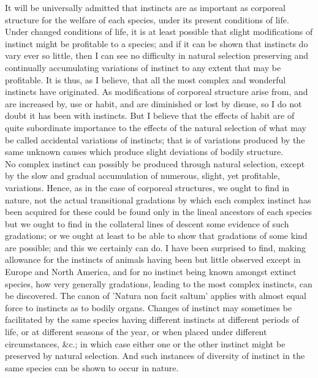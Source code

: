 \indent It will be universally admitted that instincts are as important as corporeal structure for the welfare of each species, under its present conditions of life. Under changed conditions of life, it is at least possible that slight modifications of instinct might be profitable to a species; and if it can be shown that instincts do vary ever so little, then I can see no difficulty in natural selection preserving and continually accumulating variations of instinct to any extent that may be profitable. It is thus, as I believe, that all the most complex and wonderful instincts have originated. As modifications of corporeal structure arise from, and are increased by, use or habit, and are diminished or lost by disuse, so I do not doubt it has been with instincts. But I believe that the effects of habit are of quite subordinate importance to the effects of the natural selection of what may be called accidental variations of instincts; that is of variations produced by the same unknown causes which produce slight deviations of bodily structure.\\
\indent No complex instinct can possibly be produced through natural selection, except by the slow and gradual accumulation of numerous, slight, yet profitable, variations. Hence, as in the case of corporeal structures, we ought to find in nature, not the actual transitional gradations by which each complex instinct has been acquired for these could be found only in the lineal ancestors of each species but we ought to find in the collateral lines of descent some evidence of such gradations; or we ought at least to be able to show that gradations of some kind are possible; and this we certainly can do. I have been surprised to find, making allowance for the instincts of animals having been but little observed except in Europe and North America, and for no instinct being known amongst extinct species, how very generally gradations, leading to the most complex instincts, can be discovered. The canon of 'Natura non facit saltum' applies with almost equal force to instincts as to bodily organs. Changes of instinct may sometimes be facilitated by the same species having different instincts at different periods of life, or at different seasons of the year, or when placed under different circumstances, \&c.; in which case either one or the other instinct might be preserved by natural selection. And such instances of diversity of instinct in the same species can be shown to occur in nature.\\
